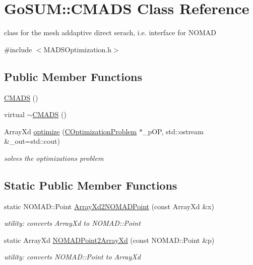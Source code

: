 \hypertarget{class_go_s_u_m_1_1_c_m_a_d_s}{\section{Go\-S\-U\-M\-:\-:C\-M\-A\-D\-S Class Reference}
\label{class_go_s_u_m_1_1_c_m_a_d_s}
}


class for the mesh addaptive direct serach, i.\-e. interface for N\-O\-M\-A\-D  




{\ttfamily \#include $<$M\-A\-D\-S\-Optimization.\-h$>$}

\subsection*{Public Member Functions}
\begin{DoxyCompactItemize}
\item 
\hyperlink{class_go_s_u_m_1_1_c_m_a_d_s_a7cab80ccbd0ee8d72f6e619d8aeb887c}{C\-M\-A\-D\-S} ()
\item 
virtual \hyperlink{class_go_s_u_m_1_1_c_m_a_d_s_a7b8028bbe89d113c40b59b8d77694d19}{$\sim$\-C\-M\-A\-D\-S} ()
\item 
Array\-Xd \hyperlink{class_go_s_u_m_1_1_c_m_a_d_s_a36e83ee14a6fcc580ed3f5e804fedcfd}{optimize} (\hyperlink{class_go_s_u_m_1_1_c_optimization_problem}{C\-Optimization\-Problem} $\ast$\-\_\-p\-O\-P, std\-::ostream \&\-\_\-out=std\-::cout)
\begin{DoxyCompactList}\small\item\em solves the optimizations problem \end{DoxyCompactList}\end{DoxyCompactItemize}
\subsection*{Static Public Member Functions}
\begin{DoxyCompactItemize}
\item 
static N\-O\-M\-A\-D\-::\-Point \hyperlink{class_go_s_u_m_1_1_c_m_a_d_s_a8fa658bbda2afe664d1a4f18e319fae2}{Array\-Xd2\-N\-O\-M\-A\-D\-Point} (const Array\-Xd \&x)
\begin{DoxyCompactList}\small\item\em utility\-: converts Array\-Xd to N\-O\-M\-A\-D\-::\-Point \end{DoxyCompactList}\item 
static Array\-Xd \hyperlink{class_go_s_u_m_1_1_c_m_a_d_s_a877db8a831536c1e7907386e941b2cd1}{N\-O\-M\-A\-D\-Point2\-Array\-Xd} (const N\-O\-M\-A\-D\-::\-Point \&p)
\begin{DoxyCompactList}\small\item\em utility\-: converts N\-O\-M\-A\-D\-::\-Point to Array\-Xd \end{DoxyCompactList}\end{DoxyCompactItemize}

